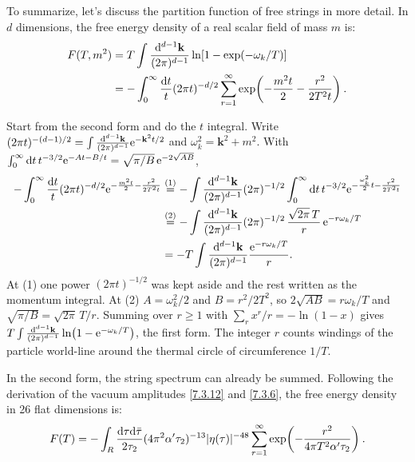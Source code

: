 To summarize, let's discuss the partition function of free strings in more detail. In $d$ dimensions, the free energy density of a real scalar field of mass $m$ is:
\begin{align}
	F(T, m^{2}) &= T \int \frac{\mathrm{d}^{d-1} \mathbf{k}}{(2 \pi)^{d-1}} \ln [1-\exp(-\omega_{k} / T)] \nonumber \\
	&= - \int_{0}^{\infty} \frac{\mathrm{d} t}{t}(2 \pi t)^{-d / 2} \sum_{r=1}^{\infty}
	\exp \biggl(-\frac{m^{2} t}{2}-\frac{r^{2}}{2 T^{2} t}\biggr) \:.
	\label{9.8.14}
\end{align}
\begin{tcolorbox}[breakable]
	\begin{remark}
		Start from the second form and do the $t$ integral. Write $(2\pi t)^{-(d-1)/2}=\int\frac{\mathrm{d}^{d-1}\mathbf k}{(2\pi)^{d-1}}\mathrm{e}^{-\mathbf k^2t/2}$ and $\omega_k^2=\mathbf k^2+m^2$. With $\int_0^\infty\mathrm{d} t\,t^{-3/2}\mathrm{e}^{-At-B/t}=\sqrt{\pi/B}\,\mathrm{e}^{-2\sqrt{AB}}$,
		\begin{align*}
			-\int_0^\infty\frac{\mathrm{d} t}{t}(2\pi t)^{-d/2}\mathrm{e}^{-\frac{m^2t}{2}-\frac{r^2}{2T^2t}}
			&\overset{(1)}{=}-\int\frac{\mathrm{d}^{d-1}\mathbf k}{(2\pi)^{d-1}}(2\pi)^{-1/2}\int_0^\infty\mathrm{d} t\,t^{-3/2}\mathrm{e}^{-\frac{\omega_k^2}{2}t-\frac{r^2}{2T^2t}}\\
			&\overset{(2)}{=}-\int\frac{\mathrm{d}^{d-1}\mathbf k}{(2\pi)^{d-1}}(2\pi)^{-1/2}\,\frac{\sqrt{2\pi}\,T}{r}\,\mathrm{e}^{-r\omega_k/T}\\
			&=-T\int\frac{\mathrm{d}^{d-1}\mathbf k}{(2\pi)^{d-1}}\frac{\mathrm{e}^{-r\omega_k/T}}{r} .
		\end{align*}
		At (1) one power $(2\pi t)^{-1/2}$ was kept aside and the rest written as the momentum integral. At (2) $A=\omega_k^2/2$ and $B=r^2/2T^2$, so $2\sqrt{AB}=r\omega_k/T$ and $\sqrt{\pi/B}=\sqrt{2\pi}\,T/r$. Summing over $r\ge1$ with $\sum_r x^r/r=-\ln(1-x)$ gives $T\int\frac{\mathrm{d}^{d-1}\mathbf k}{(2\pi)^{d-1}}\ln(1-\mathrm{e}^{-\omega_k/T})$, the first form. The integer $r$ counts windings of the particle world-line around the thermal circle of circumference $1/T$.
	\end{remark}
\end{tcolorbox}
In the second form, the string spectrum can already be summed. Following the derivation of the vacuum amplitudes \eqref{7.3.12} and \eqref{7.3.6}, the free energy density in 26 flat dimensions is:
\begin{equation}
	F(T)=-\int_{R} \frac{\mathrm{d} \tau \mathrm{d} \bar{\tau}}{2 \tau_{2}} (4 \pi^{2} \alpha^{\prime} \tau_{2})^{-13}|\eta(\tau)|^{-48} 
	\sum_{r=1}^{\infty} \exp \biggl(-\frac{r^{2}}{4 \pi T^{2} \alpha^{\prime} \tau_{2}}\biggr) \:.
	\label{9.8.15}
\end{equation}
